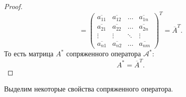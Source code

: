 \begin{proof}
\[        =
        \begin{pmatrix}
            \overline{a_{11}} & \overline{a_{12}} & \dots  & \overline{a_{1n}} \\
            \overline{a_{21}} & \overline{a_{22}} & \dots  & \overline{a_{2n}} \\
            \vdots            & \vdots            & \ddots & \vdots            \\
            \overline{a_{n1}} & \overline{a_{n2}} & \dots  & \overline{a_{nm}}
        \end{pmatrix}^T
        = \overline{A}^T .
    \]
    То есть матрица $A^*$ сопряженного оператора $\mathcal{A}^*$:
    \[
        A^* = \overline{A}^T .
    \]
\end{proof}

Выделим некоторые свойства сопряженного оператора.
